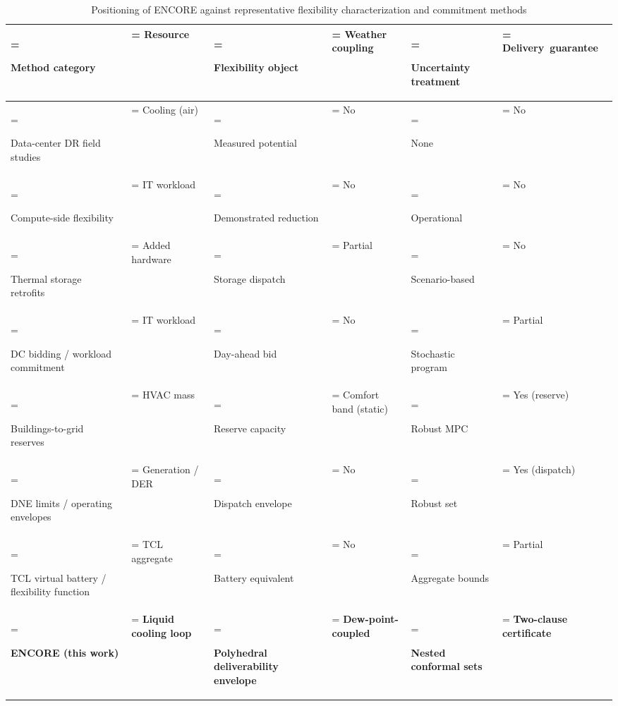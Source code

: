 \begin{table}[t]
\centering
\caption{Positioning of ENCORE against representative flexibility
characterization and commitment methods}
\label{tab:positioning}
\renewcommand{\arraystretch}{1.08}
\setlength{\tabcolsep}{2.2pt}
\scriptsize
\begin{tabularx}{\textwidth}{
>{\hsize=1.45\hsize\linewidth=\hsize\raggedright\arraybackslash}X
>{\hsize=0.85\hsize\linewidth=\hsize\centering\arraybackslash}X
>{\hsize=1.05\hsize\linewidth=\hsize\raggedright\arraybackslash}X
>{\hsize=0.80\hsize\linewidth=\hsize\centering\arraybackslash}X
>{\hsize=1.00\hsize\linewidth=\hsize\raggedright\arraybackslash}X
>{\hsize=0.85\hsize\linewidth=\hsize\centering\arraybackslash}X
}
\toprule
\textbf{Method category}
& \textbf{Resource}
& \textbf{Flexibility object}
& \textbf{Weather coupling}
& \textbf{Uncertainty treatment}
& \textbf{\mbox{Delivery guarantee}} \\
\midrule
Data-center DR field studies~\cite{ghatikar2012demand,fu2020assessments}
& Cooling (air)
& Measured potential
& No
& None
& No \\
Compute-side flexibility~\cite{colangelo2025phoenix,acun2026flexibility,wierman2014opportunities}
& IT workload
& Demonstrated reduction
& No
& Operational
& No \\
Thermal storage retrofits~\cite{oh2025rtes,zhang2025carnot,ravi2026prosumer}
& Added hardware
& Storage dispatch
& Partial
& Scenario-based
& No \\
DC bidding / workload commitment~\cite{chen2023bilevel,fan2026commitment}
& IT workload
& Day-ahead bid
& No
& Stochastic program
& Partial \\
Buildings-to-grid reserves~\cite{vrettos2016scheduling,vrettos2016robust,gorecki2017experimental}
& HVAC mass
& Reserve capacity
& Comfort band (static)
& Robust MPC
& Yes (reserve) \\
DNE limits / operating envelopes~\cite{zhao2015variable,aemo2022doe}
& Generation / DER
& Dispatch envelope
& No
& Robust set
& Yes (dispatch) \\
TCL virtual battery / flexibility function~\cite{hao2015aggregate,junker2018characterizing,warrington2013policy}
& TCL aggregate
& Battery equivalent
& No
& Aggregate bounds
& Partial \\
\textbf{ENCORE (this work)}
& \textbf{Liquid cooling loop}
& \textbf{Polyhedral deliverability envelope}
& \textbf{Dew-point-coupled}
& \textbf{Nested conformal sets}
& \textbf{Two-clause certificate} \\
\bottomrule
\end{tabularx}
\vspace{-5mm}
\end{table}

